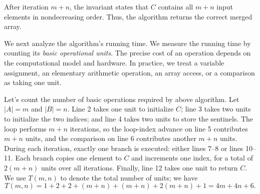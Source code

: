 After iteration $m+n$, the invariant states that $C$ contains all $m+n$ input
elements in nondecreasing order. Thus, the algorithm returns the correct
merged array.




We next analyze the algorithm's running time. We measure the running time
by counting its \emph{basic operational units}. The precise cost of an operation depends on the computational
model and hardware. In practice, we treat a variable assignment, 
an elementary arithmetic operation, an array access, or a comparison as taking one unit.


Let's count the number of basic operations required by above algorithm.
Let $|A|=m$ and $|B|=n$. Line 2 takes one unit to initialize $C$; line 3
takes two units to initialize the two indices; and line 4 takes two units to
store the sentinels. The loop performs $m+n$ iterations, so the loop-index
advance on line 5 contributes $m+n$ units, and the comparison on line 6
contributes another $m+n$ units. During each iteration, exactly one branch is
executed: either lines 7--8 or lines 10--11. Each branch copies one element to
$C$ and increments one index, for a total of $2(m+n)$ units over all
iterations. Finally, line 12 takes one unit to return $C$. 
We use $T(m,n)$ to denote the total number of units; we have
\[
T(m,n)=1+2+2+(m+n)+(m+n)+2(m+n)+1=4m+4n+6.
\]

